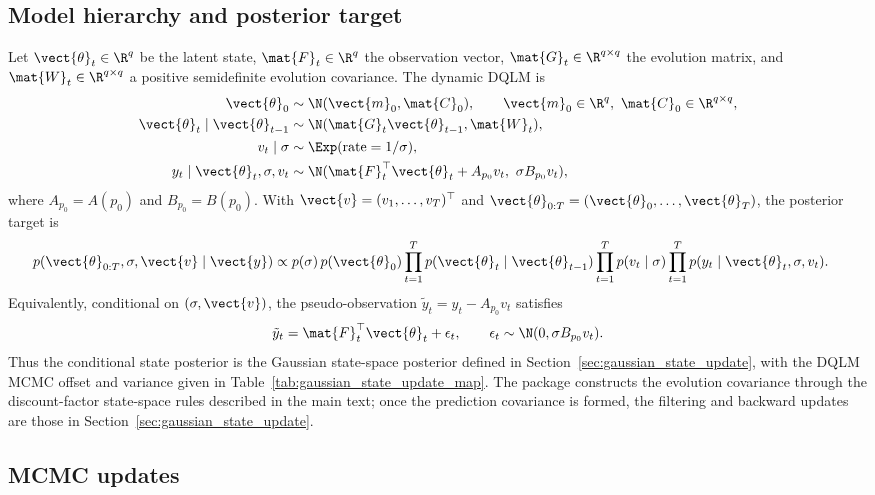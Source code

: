 \subsection{Model hierarchy and posterior target}

Let $\vect{\theta}_t\in\R^q$ be the latent state, $\mat{F}_t\in\R^q$ the
observation vector, $\mat{G}_t\in\R^{q\times q}$ the evolution matrix, and
$\mat{W}_t\in\R^{q\times q}$ a positive semidefinite evolution covariance. The
dynamic DQLM is
\begin{align}
\vect{\theta}_0 &\sim \N(\vect{m}_0,\mat{C}_0), \qquad
  \vect{m}_0\in\R^q,\ \mat{C}_0\in\R^{q\times q}, \\
\vect{\theta}_t\mid\vect{\theta}_{t-1}
&\sim \N(\mat{G}_t\vect{\theta}_{t-1},\mat{W}_t), \\
v_t\mid\sigma &\sim \Exp(\text{rate}=1/\sigma), \\
y_t\mid\vect{\theta}_t,\sigma,v_t
&\sim \N(\mat{F}_t^\top\vect{\theta}_t + A_{p_0} v_t,\ \sigma B_{p_0} v_t),
\label{eq:dyn_dqlm_hierarchy}
\end{align}
where $A_{p_0}=A(p_0)$ and $B_{p_0}=B(p_0)$. With
$\vect{v}=(v_1,\ldots,v_T)^\top$ and
$\vect{\theta}_{0:T}=(\vect{\theta}_0,\ldots,\vect{\theta}_T)$, the posterior
target is
\begin{align}
p(\vect{\theta}_{0:T},\sigma,\vect{v}\mid\vect{y})
&\propto
p(\sigma)\,p(\vect{\theta}_0)
\prod_{t=1}^T p(\vect{\theta}_t\mid\vect{\theta}_{t-1})
\prod_{t=1}^T p(v_t\mid\sigma)
\prod_{t=1}^T p(y_t\mid\vect{\theta}_t,\sigma,v_t).
\label{eq:dyn_dqlm_joint}
\end{align}
Equivalently, conditional on $(\sigma,\vect{v})$, the pseudo-observation
$\tilde y_t=y_t-A_{p_0}v_t$ satisfies
\begin{equation}
\tilde y_t=\mat{F}_t^\top\vect{\theta}_t+\epsilon_t,\qquad
\epsilon_t\sim\N(0,\sigma B_{p_0}v_t).
\label{eq:dyn_dqlm_pseudo}
\end{equation}
Thus the conditional state posterior is the Gaussian state-space posterior
defined in Section~\ref{sec:gaussian_state_update}, with the DQLM MCMC offset
and variance given in Table~\ref{tab:gaussian_state_update_map}. The package
constructs the evolution covariance through the discount-factor state-space
rules described in the main text; once the prediction covariance is formed,
the filtering and backward updates are those in
Section~\ref{sec:gaussian_state_update}.

\subsection{MCMC updates}

